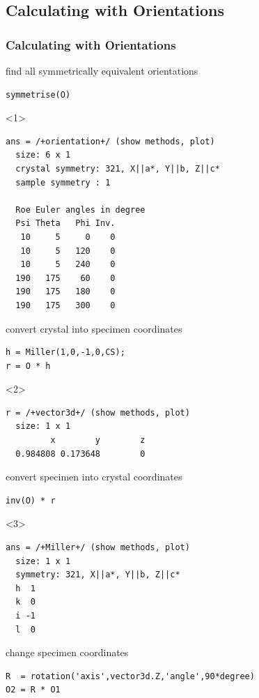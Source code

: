 \documentclass[compress]{beamer}
\begin{document}
\subsection*{Calculating with Orientations}
\label{sec:calc-with-orient}

\begin{frame}
  \frametitle{Calculating with Orientations}


  \begin{overlayarea}{\textwidth}{8cm}
  find all symmetrically equivalent orientations
\begin{lstlisting}[style=input]
symmetrise(O)
\end{lstlisting}
  \begin{onlyenv}<1>
    \vspace{-.3cm}
    \begin{lstlisting}[style=output]
ans = /+orientation+/ (show methods, plot)
  size: 6 x 1
  crystal symmetry: 321, X||a*, Y||b, Z||c*
  sample symmetry : 1

  Roe Euler angles in degree
  Psi Theta   Phi Inv.
   10     5     0    0
   10     5   120    0
   10     5   240    0
  190   175    60    0
  190   175   180    0
  190   175   300    0
\end{lstlisting}
  \end{onlyenv}

  \pause
  \medskip

  convert crystal into specimen coordinates
\begin{lstlisting}[style=input]
h = Miller(1,0,-1,0,CS);
r = O * h
\end{lstlisting}
  \begin{onlyenv}<2>
    \vspace{-.3cm}
    \begin{lstlisting}[style=output]
r = /+vector3d+/ (show methods, plot)
  size: 1 x 1
         x        y        z
  0.984808 0.173648        0
\end{lstlisting}
  \end{onlyenv}

  \pause
  \medskip

  convert specimen into crystal coordinates
\begin{lstlisting}[style=input]
inv(O) * r
\end{lstlisting}
  \begin{onlyenv}<3>
    \vspace{-.3cm}
    \begin{lstlisting}[style=output]
ans = /+Miller+/ (show methods, plot)
  size: 1 x 1
  symmetry: 321, X||a*, Y||b, Z||c*
  h  1
  k  0
  i -1
  l  0
\end{lstlisting}
  \end{onlyenv}

  \pause
  \medskip

  change specimen coordinates
  \begin{lstlisting}[style=input]
R  = rotation('axis',vector3d.Z,'angle',90*degree)
O2 = R * O1
\end{lstlisting}
\end{overlayarea}

\end{frame}
\end{document}
